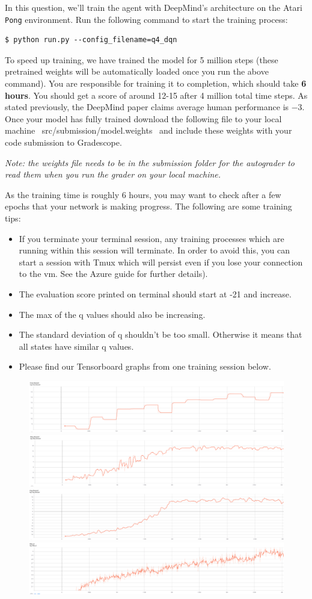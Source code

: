 \item {}

In this question, we'll train the agent with DeepMind's architecture on the Atari \texttt{Pong} environment. Run the following command to start the training process:
\begin{lstlisting}
$ python run.py --config_filename=q4_dqn
\end{lstlisting}
To speed up training, we have trained the model for 5 million steps (these pretrained weights will be automatically loaded once you run the above command). You are responsible for training it to completion, which should take \textbf{6 hours}. You should get a score of around 12-15 after 4 million total time steps.  As stated previously, the DeepMind paper claims average human performance is $ -3 $. Once your model has fully trained download the following file to your local machine ~src/submission/model.weights~ and include these weights with your code submission to Gradescope. 

\textit{Note: the weights file needs to be in the submission folder for the autograder to read them when you run the grader on your local machine.}


As the training time is roughly 6 hours, you may want to check after a few epochs that your network is making progress.  The following are some training tips:

\begin{itemize}
\item If you terminate your terminal session, any training processes which are running within this session will terminate.  In order to avoid this, you can start a session with Tmux which will persist even if you lose your connection to the vm. See the Azure guide for further details).
\item The evaluation score printed on terminal should start at -21 and increase.
\item The max of the q values should also be increasing.
\item The standard deviation of q shouldn't be too small. Otherwise it means that all states have similar q values.
\item Please find our Tensorboard graphs from one training session below.
\end{itemize}

\begin{figure}[H]
\centering
  \includegraphics[width=.4\linewidth]{images/Eval_R.png}
  \includegraphics[width=.4\linewidth]{images/Max_R.png}
  \includegraphics[width=.4\linewidth]{images/Avg_R.png}
  \includegraphics[width=.4\linewidth]{images/Max_Q.png}
\end{figure}